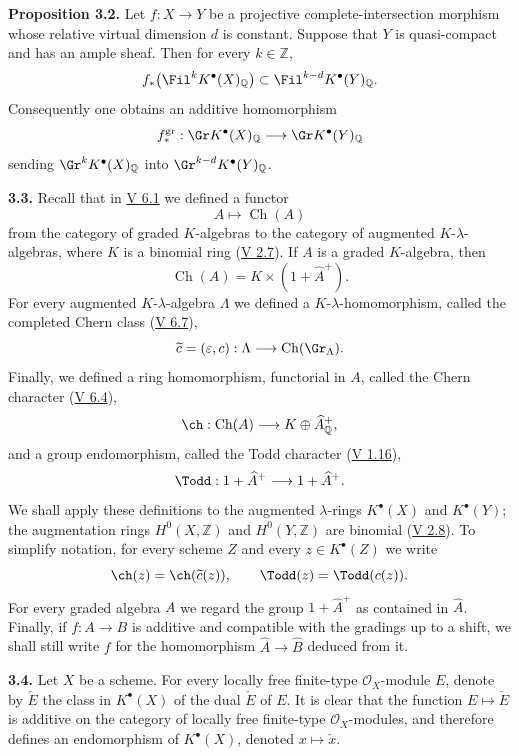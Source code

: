 \textbf{Proposition 3.2.} Let $f:X\to Y$ be a projective complete-intersection morphism whose relative virtual dimension $d$ is constant. Suppose that $Y$ is quasi-compact and has an ample sheaf. Then for every $k\in\mathbb Z$,
\[
f_*\bigl(\Fil^kK^{\bullet}(X)_{\mathbb Q}\bigr)
\subset
\Fil^{k-d}K^{\bullet}(Y)_{\mathbb Q}.
\]
Consequently one obtains an additive homomorphism
\[
f^{\mathrm{gr}}_*:\Gr K^{\bullet}(X)_{\mathbb Q}\longrightarrow
\Gr K^{\bullet}(Y)_{\mathbb Q}
\]
sending $\Gr^kK^{\bullet}(X)_{\mathbb Q}$ into $\Gr^{k-d}K^{\bullet}(Y)_{\mathbb Q}$.

\textbf{3.3.} Recall that in \hyperlink{sga6.e05.para.6-1}{V 6.1} we defined a functor
\[
A\longmapsto \operatorname{Ch}(A)
\]
from the category of graded $K$-algebras to the category of augmented $K$-$\lambda$-algebras, where $K$ is a binomial ring (\hyperlink{sga6.e05.def.2-7}{V 2.7}). If $A$ is a graded $K$-algebra, then
\[
\operatorname{Ch}(A)=K\times(1+\widehat A^+).
\]
For every augmented $K$-$\lambda$-algebra $\Lambda$ we defined a $K$-$\lambda$-homomorphism, called the completed Chern class (\hyperlink{sga6.e05.para.6-7}{V 6.7}),
\[
\widetilde c=(\varepsilon,c):\Lambda\longrightarrow\operatorname{Ch}(\Gr_{\Lambda}).
\]
Finally, we defined a ring homomorphism, functorial in $A$, called the Chern character (\hyperlink{sga6.e05.def.6-4}{V 6.4}),
\[
\ch:\operatorname{Ch}(A)\longrightarrow K\oplus\widehat A^+_{\mathbb Q},
\]
and a group endomorphism, called the Todd character (\hyperlink{sga6.e05.para.1-16}{V 1.16}),
\[
\Todd:1+\widehat A^+\longrightarrow 1+\widehat A^+.
\]
We shall apply these definitions to the augmented $\lambda$-rings $K^{\bullet}(X)$ and $K^{\bullet}(Y)$; the augmentation rings $H^0(X,\mathbb Z)$ and $H^0(Y,\mathbb Z)$ are binomial (\hyperlink{sga6.e05.ex.2-8}{V 2.8}). To simplify notation, for every scheme $Z$ and every $z\in K^{\bullet}(Z)$ we write
\[
\ch(z)=\ch(\widetilde c(z)),
\qquad
\Todd(z)=\Todd(c(z)).
\]
For every graded algebra $A$ we regard the group $1+\widehat A^+$ as contained in $\widehat A$. Finally, if $f:A\to B$ is additive and compatible with the gradings up to a shift, we shall still write $f$ for the homomorphism $\widehat A\to\widehat B$ deduced from it.

\textbf{3.4.} Let $X$ be a scheme. For every locally free finite-type $\mathcal O_X$-module $E$, denote by $\check E$ the class in $K^{\bullet}(X)$ of the dual $\check E$ of $E$. It is clear that the function $E\mapsto\check E$ is additive on the category of locally free finite-type $\mathcal O_X$-modules, and therefore defines an endomorphism of $K^{\bullet}(X)$, denoted $x\mapsto\check x$.

